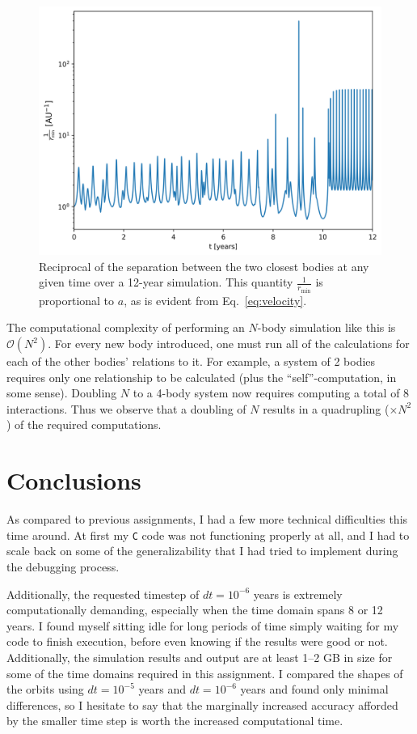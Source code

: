\documentclass{article}
\begin{document}
\begin{figure}[H]
    \centering
    \includegraphics[width=5in]{homework4/minsep.png}
    \caption{Reciprocal of the separation between the two closest bodies at any given time over a 12-year simulation. This quantity $\frac{1}{r_\text{min}}$ is proportional to $a$, as is evident from Eq.~\ref{eq:velocity}.}
    \label{fig:minsep}
\end{figure}

\bigskip
{}
\medskip

The computational complexity of performing an $N$-body simulation like this is $\mathcal{O}(N^2)$. For every new body introduced, one must run all of the calculations for each of the other bodies' relations to it. For example, a system of 2 bodies requires only one relationship to be calculated (plus the ``self''-computation, in some sense). Doubling $N$ to a 4-body system now requires computing a total of 8 interactions. Thus we observe that a doubling of $N$ results in a quadrupling ($\times N^2$) of the required computations.

\section{Conclusions}

As compared to previous assignments, I had a few more technical difficulties this time around. At first my \texttt{C} code was not functioning properly at all, and I had to scale back on some of the generalizability that I had tried to implement during the debugging process.

Additionally, the requested timestep of $dt=10^{-6}$ years is extremely computationally demanding, especially when the time domain spans 8 or 12 years. I found myself sitting idle for long periods of time simply waiting for my code to finish execution, before even knowing if the results were good or not. Additionally, the simulation results and output are at least 1--2 GB in size for some of the time domains required in this assignment. I compared the shapes of the orbits using $dt=10^{-5}$ years and $dt=10^{-6}$ years and found only minimal differences, so I hesitate to say that the marginally increased accuracy afforded by the smaller time step is worth the increased computational time.
\end{document}
